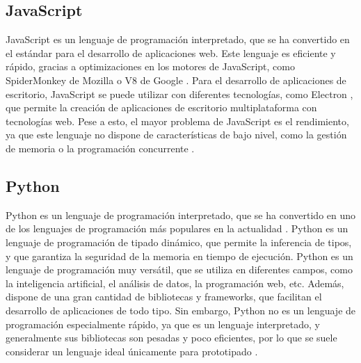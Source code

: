 \subsection{JavaScript}
\noindent JavaScript es un lenguaje de programación interpretado, que se ha convertido en el estándar para el desarrollo de aplicaciones web. Este lenguaje es eficiente y rápido, gracias a optimizaciones en los motores de JavaScript, como SpiderMonkey de Mozilla o V8 de Google \autocite{srinetChromeV8Firefox2022}. Para el desarrollo de aplicaciones de escritorio, JavaScript se puede utilizar con diferentes tecnologías, como Electron \autocite{BuildCrossplatformDesktop}, que permite la creación de aplicaciones de escritorio multiplataforma con tecnologías web. Pese a esto, el mayor problema de JavaScript es el rendimiento, ya que este lenguaje no dispone de características de bajo nivel, como la gestión de memoria o la programación concurrente \autocite{MemoryManagementJavaScript2025,pengMultithreadingJavascript2017}.

\subsection{Python}
\noindent Python es un lenguaje de programación interpretado, que se ha convertido en uno de los lenguajes de programación más populares en la actualidad \autocite{TIOBEIndex}. Python es un lenguaje de programación de tipado dinámico, que permite la inferencia de tipos, y que garantiza la seguridad de la memoria en tiempo de ejecución. Python es un lenguaje de programación muy versátil, que se utiliza en diferentes campos, como la inteligencia artificial, el análisis de datos, la programación web, etc. Además, dispone de una gran cantidad de bibliotecas y frameworks, que facilitan el desarrollo de aplicaciones de todo tipo. Sin embargo, Python no es un lenguaje de programación especialmente rápido, ya que es un lenguaje interpretado, y generalmente sus bibliotecas son pesadas y poco eficientes, por lo que se suele considerar un lenguaje ideal únicamente para prototipado \autocite{SlowestProgrammingLanguages2020}.

